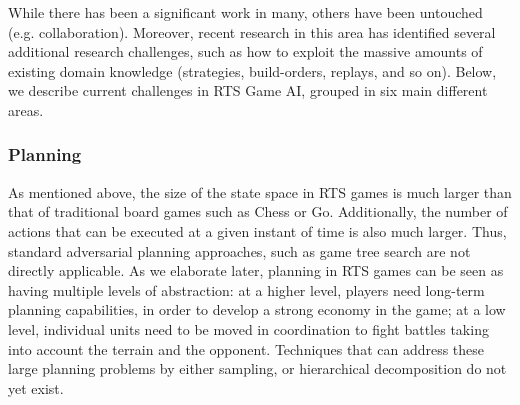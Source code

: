 \documentclass{llncs}
\begin{document}
While there  has been  a significant  work in  many, others  have been
untouched (e.g. collaboration). Moreover, recent research in this area
has identified several additional research  challenges, such as how to
exploit the massive amounts  of existing domain knowledge (strategies,
build-orders,  replays,  and  so   on).  Below,  we  describe  current
challenges in RTS Game AI, grouped in six main different areas.


\subsubsection{Planning}
As mentioned above, the  size of the state space in  RTS games is much
larger  than  that  of  traditional  board  games  such  as  Chess  or
Go. Additionally,  the number  of actions  that can  be executed  at a
given instant of time is  also much larger. Thus, standard adversarial
planning  approaches,  such  as  game tree  search  are  not  directly
applicable. As we  elaborate later, planning in RTS games  can be seen
as having multiple  levels of abstraction: at a  higher level, players
need long-term  planning capabilities,  in order  to develop  a strong
economy in the game; at a low level, individual units need to be moved
in coordination to  fight battles taking into account  the terrain and
the  opponent.  Techniques  that  can  address  these  large  planning
problems by either sampling, or  hierarchical decomposition do not yet
exist.
\end{document}
